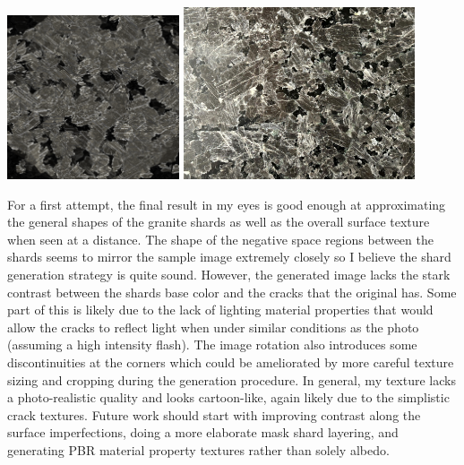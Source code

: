 \documentclass[a4paper, 11pt, titlepage]{article}
\begin{document}
 {
    \includegraphics[width=2.0in]{images/final.png}
    \includegraphics[height=2.0in]{images/sample.png}
}

For a first attempt, the final result in my eyes is good enough at approximating
the general shapes of the granite shards as well as the overall surface texture when
seen at a distance. The shape of the negative space regions between the shards
seems to mirror the sample image extremely closely so I believe the shard
generation strategy is quite sound. However, the generated image lacks the stark
contrast between the shards base color and the cracks that the original has.
Some part of this is likely due to the lack of lighting material properties that
would allow the cracks to reflect light when under similar conditions as the
photo (assuming a high intensity flash). The image rotation also introduces some
discontinuities at the corners which could be ameliorated by more careful
texture sizing and cropping during the generation procedure. In general, my
texture lacks a photo-realistic quality and looks cartoon-like, again likely due
to the simplistic crack textures. Future work should start with improving
contrast along the surface imperfections, doing a more elaborate mask shard
layering, and generating PBR material property textures rather than solely albedo.
\end{document}
